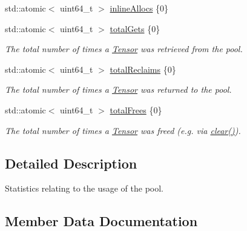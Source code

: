 \begin{DoxyCompactItemize}
std\+::atomic$<$ uint64\+\_\+t $>$ \hyperlink{structglow_1_1_tensor_pool_1_1_stats_ac98e24cc1dc9bed9b00d33ae7387927d}{inline\+Allocs} \{0\}
\item 
\mbox{\label{structglow_1_1_tensor_pool_1_1_stats_acb97f11eafe11c3a56dd185e55ee99b0}} 
std\+::atomic$<$ uint64\+\_\+t $>$ \hyperlink{structglow_1_1_tensor_pool_1_1_stats_acb97f11eafe11c3a56dd185e55ee99b0}{total\+Gets} \{0\}
\begin{DoxyCompactList}\small\item\em The total number of times a \hyperlink{classglow_1_1_tensor}{Tensor} was retrieved from the pool. \end{DoxyCompactList}\item 
\mbox{\label{structglow_1_1_tensor_pool_1_1_stats_a1fe6baf6dc7fe3e80198940fb882e113}} 
std\+::atomic$<$ uint64\+\_\+t $>$ \hyperlink{structglow_1_1_tensor_pool_1_1_stats_a1fe6baf6dc7fe3e80198940fb882e113}{total\+Reclaims} \{0\}
\begin{DoxyCompactList}\small\item\em The total number of times a \hyperlink{classglow_1_1_tensor}{Tensor} was returned to the pool. \end{DoxyCompactList}\item 
\mbox{\label{structglow_1_1_tensor_pool_1_1_stats_ae04ac5ea8f3e827ff7f457714e6d0f92}} 
std\+::atomic$<$ uint64\+\_\+t $>$ \hyperlink{structglow_1_1_tensor_pool_1_1_stats_ae04ac5ea8f3e827ff7f457714e6d0f92}{total\+Frees} \{0\}
\begin{DoxyCompactList}\small\item\em The total number of times a \hyperlink{classglow_1_1_tensor}{Tensor} was freed (e.\+g. via \hyperlink{classglow_1_1_tensor_pool_a67ae82ff913ef17d2b18cb86182b0546}{clear()}). \end{DoxyCompactList}\end{DoxyCompactItemize}


\subsection{Detailed Description}
Statistics relating to the usage of the pool. 

\subsection{Member Data Documentation}
\mbox{\label{structglow_1_1_tensor_pool_1_1_stats_ac98e24cc1dc9bed9b00d33ae7387927d}} 
